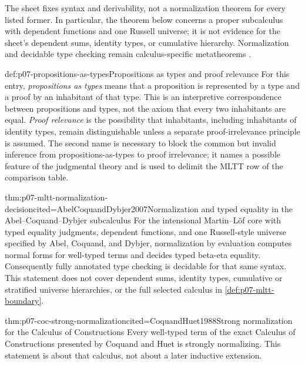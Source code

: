 The sheet fixes syntax and derivability, not a normalization theorem for every
listed former.  In particular, the theorem below concerns a proper subcalculus
with dependent functions and one Russell universe; it is not evidence for the
sheet's dependent sums, identity types, or cumulative hierarchy.  Normalization
and decidable type checking remain calculus-specific metatheorems
\cite{MartinLof1984,AbelCoquandDybjer2007}.

\begin{hbdefinition}{def:p07-propositions-as-types}{Propositions as types and proof relevance}
For this entry, \emph{propositions as types} means that a proposition is
represented by a type and a proof by an inhabitant of that type.  This is an
interpretive correspondence between propositions and types, not the axiom
that every two inhabitants are equal.  \emph{Proof relevance} is the
possibility that inhabitants, including inhabitants of identity types, remain
distinguishable unless a separate proof-irrelevance principle is assumed.
The second name is necessary to block the common but invalid inference from
propositions-as-types to proof irrelevance; it names a possible feature of
the judgmental theory and is used to delimit the MLTT row of the comparison
table.
\end{hbdefinition}

\begin{hbtheorem}{thm:p07-mltt-normalization-decision}{cited=AbelCoquandDybjer2007}{Normalization and typed equality in the Abel--Coquand--Dybjer subcalculus}
For the intensional Martin--L\"of core with typed equality judgments,
dependent functions, and one Russell-style universe specified by Abel,
Coquand, and Dybjer, normalization by evaluation computes normal forms for
well-typed terms and decides typed beta-eta equality.  Consequently fully
annotated type checking is decidable for that same syntax.  This statement
does not cover dependent sums, identity types, cumulative or stratified
universe hierarchies, or the full selected calculus in
\ref{def:p07-mltt-boundary}.
\end{hbtheorem}

\begin{hbtheorem}{thm:p07-coc-strong-normalization}{cited=CoquandHuet1988}{Strong normalization for the Calculus of Constructions}
Every well-typed term of the exact Calculus of Constructions presented by
Coquand and Huet is strongly normalizing.  This statement is about that
calculus, not about a later inductive extension.
\end{hbtheorem}


